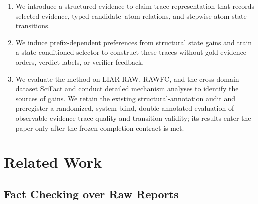 \documentclass[letterpaper]{article}
\begin{document}

\begin{enumerate}
\item We introduce a structured evidence-to-claim trace representation that records selected evidence, typed candidate–atom relations, and stepwise atom-state transitions.

\item We induce prefix-dependent preferences from structural state gains and train a state-conditioned selector to construct these traces without gold evidence orders, verdict labels, or verifier feedback.

\item We evaluate the method on LIAR-RAW, RAWFC, and the cross-domain dataset SciFact and conduct detailed mechanism analyses to identify the sources of gains. We retain the existing structural-annotation audit and preregister a randomized, system-blind, double-annotated evaluation of observable evidence-trace quality and transition validity; its results enter the paper only after the frozen completion contract is met.
\end{enumerate}

\section{Related Work}

\subsection{Fact Checking over Raw Reports}
\end{document}
